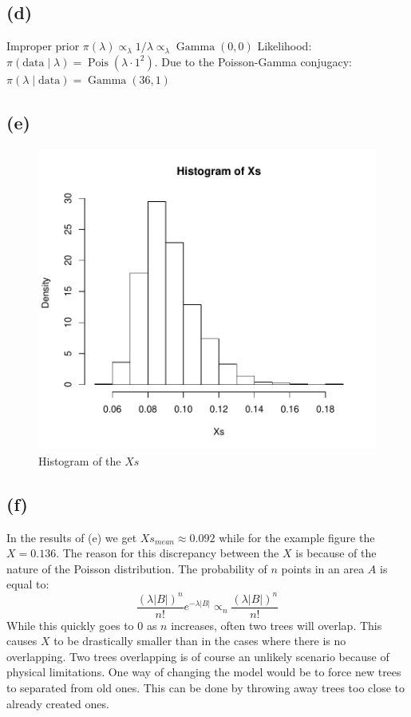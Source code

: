 \documentclass{article}
\DeclareMathOperator\Poisson{Pois}
\DeclareMathOperator\GammaDist{Gamma}
\begin{document}
\subsection{(d)}
Improper prior $\pi(\lambda) \propto_\lambda 1/\lambda \propto_\lambda \GammaDist(0, 0)$
Likelihood: $\pi(\text{data} \mid \lambda) = \Poisson(\lambda \cdot 1^2)$.
Due to the Poisson-Gamma conjugacy: $\pi(\lambda \mid \text{data}) = \GammaDist(36, 1)$

\subsection{(e)}
\begin{figure}
    \centering
    \includegraphics[scale = 0.7]{Histo_Xs.pdf}
    \caption{Histogram of the $Xs$}
\end{figure}

\subsection{(f)}
In the results of (e) we get $Xs_{mean} \approx 0.092$ while for the example figure the $X = 0.136$.
The reason for this discrepancy between the $X$ is because of the nature of the Poisson distribution.
The probability of $n$ points in an area $A$ is equal to: 
$$\frac{(\lambda |B|)^n}{n!}e^{-\lambda|B|} \propto_n \frac{(\lambda |B|)^n}{n!}$$
While this quickly goes to $0$ as $n$ increases, often two trees will overlap.
This causes $X$ to be drastically smaller than in the cases where there is no overlapping. 
Two trees overlapping is of course an unlikely scenario because of physical limitations.
One way of changing the model would be to force new trees to separated from old ones.
This can be done by throwing away trees too close to already created ones.
\end{document}
